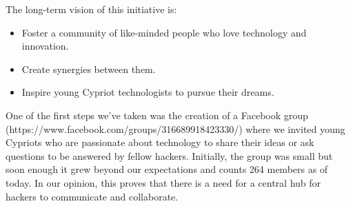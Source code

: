 \documentclass[a4paper,11pt]{report}
\begin{document}
The long-term vision of this initiative is:
\begin{itemize}
  \item Foster a community of like-minded people who love technology and innovation.
  \item Create synergies between them.
  \item Inspire young Cypriot technologists to pursue their dreams.  
\end{itemize}

One of the first steps we've taken was the creation of a Facebook group (https://www.facebook.com/groups/316689918423330/) where we invited young Cypriots who are passionate about technology to share their ideas or ask questions to be answered by fellow hackers. Initially, the group was small but soon enough it grew beyond our expectations and counts 264 members as of today. In our opinion, this proves that there is a need for a central hub for hackers to communicate and collaborate.
\end{document}
